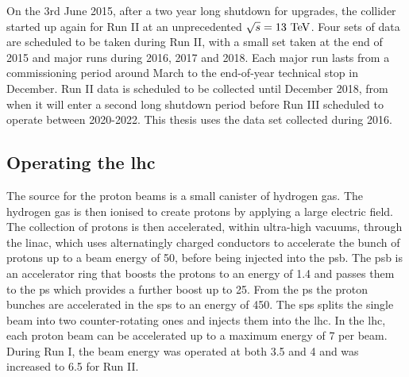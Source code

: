 On the 3rd June 2015, after a two year long shutdown for upgrades, the collider started up again for Run II at an unprecedented $\sqrt{s}=13\mathrm{~Te\hspace{-.08em}V}^{}$. 
Four sets of data are scheduled to be taken during Run II, with a small set taken at the end of 2015 and major runs during 2016, 2017 and 2018.
Each major run lasts from a commissioning period around March to the end-of-year technical stop in December.
Run II data is scheduled to be collected until December 2018, from when it will enter a second long shutdown period before Run III scheduled to operate between 2020-2022.
This thesis uses the data set collected during 2016.

\subsection{Operating the \acrshort{lhc}}
\label{ssec:LHCoperation}

The source for the proton beams is a small canister of hydrogen gas. 
The hydrogen gas is then ionised to create protons by applying a large electric field.
The collection of protons is then accelerated, within ultra-high vacuums, through the \acrfull{linac}, which uses alternatingly charged conductors to accelerate the bunch of protons up to a beam energy of 50\MeV{}, before being injected into the \acrfull{psb}.
The \acrshort{psb} is an accelerator ring that boosts the protons to an energy of 1.4\GeV{} and passes them to the \acrfull{ps} which provides a further boost up to 25\GeV{}.
From the \acrshort{ps} the proton bunches are accelerated in the \acrfull{sps} to an energy of 450\GeV{}. 
The \acrshort{sps} splits the single beam into two counter-rotating ones and injects them into the \acrshort{lhc}.
In the \acrshort{lhc}, each proton beam can be accelerated up to a maximum energy of 7\TeV{} per beam. 
During Run I, the beam energy was operated at both 3.5 and 4\TeV{} and was increased to 6.5\TeV{} for Run II. 

